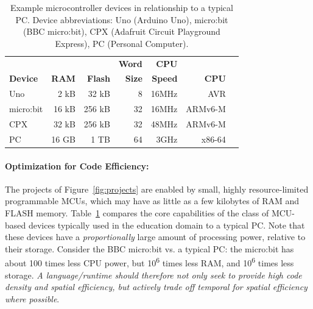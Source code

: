\begin{table}[t]
    \centering
    \caption{\label{table:devices}Example microcontroller devices in relationship to a typical PC. Device abbreviations: Uno (Arduino Uno), micro:bit (BBC micro:bit), CPX (Adafruit Circuit Playground Express), PC (Personal Computer).}
    \vspace{-10pt}
    \begin{tabular}{|l|r|r|r|r|r|r|}
    \hline
                           &          &              & \bf{Word}  & \bf{CPU} &            \\
    \bf{Device}            & \bf{RAM} & \bf{Flash}   & \bf{Size}  & \bf{Speed} & \bf{CPU}  \\ \hline
    Uno            & 2 kB       & 32 kB      & 8          & 16MHz & AVR       \\ \hline
    micro:bit          & 16 kB      & 256 kB     & 32         & 16MHz & ARMv6-M     \\ \hline
    CPX           & 32 kB      & 256 kB     & 32         & 48MHz & ARMv6-M   \\ \hline
    PC             & 16 GB      & 1 TB       & 64         & 3GHz & x86-64      \\ \hline
    \end{tabular}
    \setlength{\textfloatsep}{-10pt}

    \vspace{-5pt}
\end{table}

\paragraph{Optimization for Code Efficiency:}
The projects of Figure~\ref{fig:projects} are enabled by small, highly resource-limited programmable MCUs, which may have as little as a few kilobytes of RAM and FLASH memory.
Table~\ref{table:devices} compares the core capabilities of the class of MCU-based devices typically used in the education domain to a typical PC. Note that these devices have a \emph{proportionally} large amount of processing power, relative to their storage. Consider the BBC micro:bit vs. a typical PC: the micro:bit has about 100 times less CPU power, but 10\textsuperscript{6} times less RAM, and 10\textsuperscript{6} times less storage. \emph{A language/runtime should therefore not only seek to provide high code density and spatial efficiency, but actively trade off temporal for spatial efficiency where possible}.

